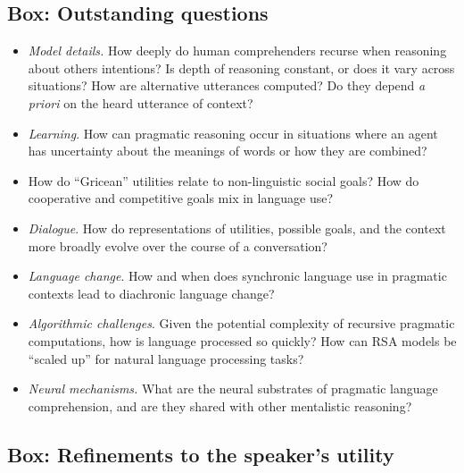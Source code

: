 \documentclass[]{elsarticle}
\begin{document}
\subsection{Box: Outstanding questions
}\label{box-outstanding-questions}

\begin{itemize}
\item
  \emph{Model details.} How deeply do human comprehenders recurse when
  reasoning about others intentions? Is depth of reasoning constant, or
  does it vary across situations? How are alternative utterances
  computed? Do they depend \emph{a priori} on the heard utterance of
  context?
\item
  \emph{Learning}. How can pragmatic reasoning occur in situations where
  an agent has uncertainty about the meanings of words or how they are
  combined?
\item
  How do ``Gricean'' utilities relate to non-linguistic social goals?
  How do cooperative and competitive goals mix in language use?
\item
  
  \emph{Dialogue}. How do representations of utilities, possible goals,
  and the context more broadly evolve over the course of a conversation?

\item
  
  \emph{Language change}. How and when does synchronic language use in
  pragmatic contexts lead to diachronic language change?
  
\item
  
  \emph{Algorithmic challenges}. Given the potential complexity of
  recursive pragmatic computations, how is language processed so
  quickly? How can RSA models be ``scaled up'' for natural language
  processing tasks?
  
\item
  
  \emph{Neural mechanisms.} What are the neural substrates of pragmatic
  language comprehension, and are they shared with other mentalistic
  reasoning?
  
\end{itemize}

\subsection{Box: Refinements to the speaker's
utility}\label{box-refinements-to-the-speakers-utility}
\end{document}
